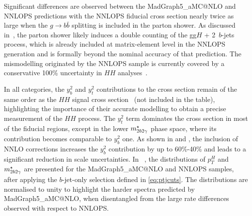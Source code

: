 \documentclass[11pt,a4paper]{article}
\begin{document}
Significant differences are observed between the {\sc MadGraph5\_aMC@NLO} and {\sc NNLOPS} predictions with the {\sc NNLOPS} fiducial cross section nearly twice as large when the  $g\rightarrow b\bar{b}$ splitting is included in the parton shower. As discussed in~, the parton shower likely induces a double counting of the gg$H$ + 2~$b$-jets process, which is already included at matrix-element level in the {\sc NNLOPS} generation and is formally beyond the nominal accuracy of that prediction. The mismodelling originated by the {\sc NNLOPS} sample is currently covered by a conservative 100\% uncertainty in $HH$ analyses~\cite{HDBS-2021-10,ATLAS:2025hhd}. 

In all categories, the $y_b^2$ and $y_t^2$ contributions to the \bbH{} cross section remain of the same order as the $HH$ signal cross section~\cite{manzoni:2023qaf} (not included in the table), highlighting the importance of their accurate modelling to obtain a precise measurement of the $HH$ process. The $y_t^2$ term dominates the \bbH{} cross section in most of the fiducial regions, except in the lower $m_{2b2\gamma}^{\star}$ phase space, where its contribution becomes comparable to $y_b^2$ one. As shown in  and , the inclusion of NNLO corrections increases the $y_b^2$ contribution by up to 60\%-40\% and leads to a significant reduction in scale uncertainties. In ~, the distributions of $p_T^H$ and $m_{2b2\gamma}^{\star}$ are presented for the {\sc MadGraph5\_aMC@NLO} and {\sc NNLOPS} samples, after applying the $b$-jet-only selection defined in \eqref{eq:ptjcuts}. The distributions are normalised to unity to highlight the harder spectra predicted by {\sc MadGraph5\_aMC@NLO}, when disentangled from the large rate differences observed with respect to {\sc NNLOPS}.
\end{document}
